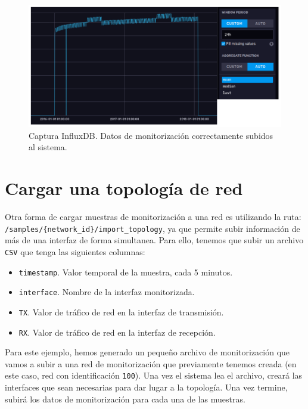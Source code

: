 \documentclass[a4paper, oneside, 12pt]{book}
\begin{document}
	\begin{figure}[h!]
		\begin{center}
			\includegraphics[width=1\textwidth]{diag/influxdb_data_1.png}
			\caption{Captura InfluxDB. Datos de monitorización correctamente subidos al sistema.}
			\label{img: influxdb data 1}
		\end{center}
	\end{figure}
	
	\pagebreak
	
	\section{Cargar una topología de red}
	
	\noindent Otra forma de cargar muestras de monitorización a una red es utilizando la ruta: \\
	 \texttt{/samples/\{network\_id\}/import\_topology}, ya que permite subir información de más de una interfaz de forma simultanea. Para ello, tenemos que subir un archivo \texttt{CSV} que tenga las siguientes columnas:
	 
	 \begin{itemize}
	 	\item \texttt{timestamp}. Valor temporal de la muestra, cada 5 minutos.
	 	\item \texttt{interface}. Nombre de la interfaz monitorizada.
	 	\item \texttt{TX}. Valor de tráfico de red en la interfaz de transmisión.
	 	\item \texttt{RX}. Valor de tráfico de red en la interfaz de recepción.
	 \end{itemize}
 
 	\noindent Para este ejemplo, hemos generado un pequeño archivo de monitorización que vamos a subir a una red de monitorización que previamente tenemos creada (en este caso, red con identificación \texttt{100}). Una vez el sistema lea el archivo, creará las interfaces que sean necesarias para dar lugar a la topología. Una vez termine, subirá los datos de monitorización para cada una de las muestras. \\
 	
\end{document}

